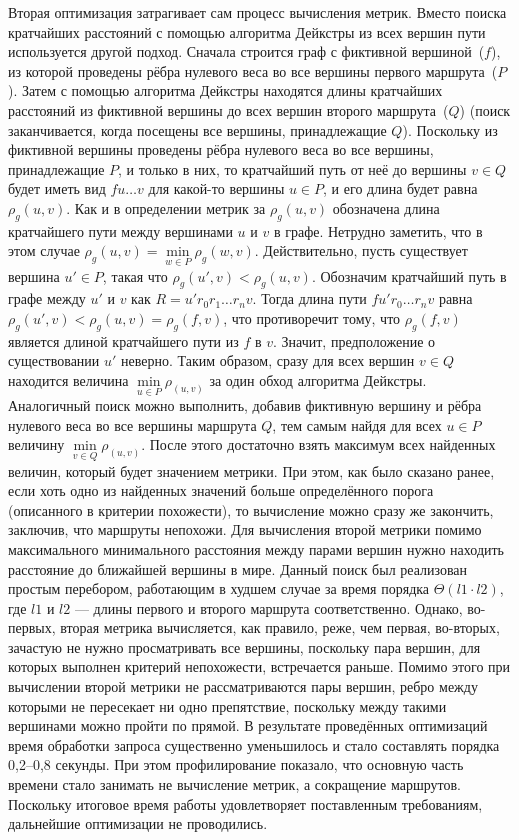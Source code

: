 Вторая оптимизация затрагивает сам процесс вычисления метрик. Вместо
поиска кратчайших расстояний с помощью алгоритма Дейкстры из всех
вершин пути используется другой подход. Сначала строится граф с
фиктивной вершиной~($f$), из которой проведены рёбра нулевого веса во
все вершины первого маршрута~($P$). Затем с помощью алгоритма Дейкстры
находятся длины кратчайших расстояний из фиктивной вершины до всех
вершин второго маршрута~($Q$) (поиск заканчивается, когда посещены все
вершины, принадлежащие $Q$). Поскольку из фиктивной вершины проведены
рёбра нулевого веса во все вершины, принадлежащие $P$, и только в них,
то кратчайший путь от неё до вершины $v \in Q$ будет иметь вид
$fu \dots v$ для какой-то вершины $u \in P$, и его длина будет равна
$\rho_g(u, v)$. Как и в определении метрик за $\rho_g(u, v)$
обозначена длина кратчайшего пути между вершинами $u$ и $v$ в графе.
Нетрудно заметить, что в этом случае
$\rho_g(u, v) = \min\limits_{w \in P} \rho_g(w, v)$. Действительно,
пусть существует вершина $u' \in P$, такая что
$\rho_g(u', v) < \rho_g(u, v)$. Обозначим кратчайший путь в графе
между $u'$ и $v$ как $R = u'r_0r_1 \dots r_nv$. Тогда длина пути
$fu'r_0 \dots r_nv$ равна
$\rho_g(u', v) < \rho_g(u, v) = \rho_g(f, v)$, что противоречит тому,
что $\rho_g(f, v)$ является длиной кратчайшего пути из $f$ в $v$.
Значит, предположение о существовании $u'$ неверно. Таким образом,
сразу для всех вершин $v \in Q$ находится величина
$\min\limits_{u \in P} \rho_(u, v)$ за один обход алгоритма Дейкстры.
Аналогичный поиск можно выполнить, добавив фиктивную вершину и рёбра
нулевого веса во все вершины маршрута $Q$, тем самым найдя для всех
$u \in P$ величину $\min\limits_{v \in Q} \rho_(u, v)$. После этого
достаточно взять максимум всех найденных величин, который будет
значением метрики. При этом, как было сказано ранее, если хоть одно из
найденных значений больше определённого порога (описанного в критерии
похожести), то вычисление можно сразу же закончить, заключив, что
маршруты непохожи. Для вычисления второй метрики помимо максимального
минимального расстояния между парами вершин нужно находить расстояние
до ближайшей вершины в мире. Данный поиск был реализован простым
перебором, работающим в худшем случае за время порядка
$\Theta(l1 \cdot l2)$, где $l1$ и $l2$ --- длины первого и второго
маршрута соответственно. Однако, во-первых, вторая метрика
вычисляется, как правило, реже, чем первая, во-вторых, зачастую не
нужно просматривать все вершины, поскольку пара вершин, для которых
выполнен критерий непохожести, встречается раньше. Помимо этого при
вычислении второй метрики не рассматриваются пары вершин, ребро между
которыми не пересекает ни одно препятствие, поскольку между такими
вершинами можно пройти по прямой. В результате проведённых оптимизаций
время обработки запроса существенно уменьшилось и стало составлять
порядка 0,2--0,8 секунды. При этом профилирование показало, что
основную часть времени стало занимать не вычисление метрик, а
сокращение маршрутов. Поскольку итоговое время работы удовлетворяет
поставленным требованиям, дальнейшие оптимизации не проводились.


